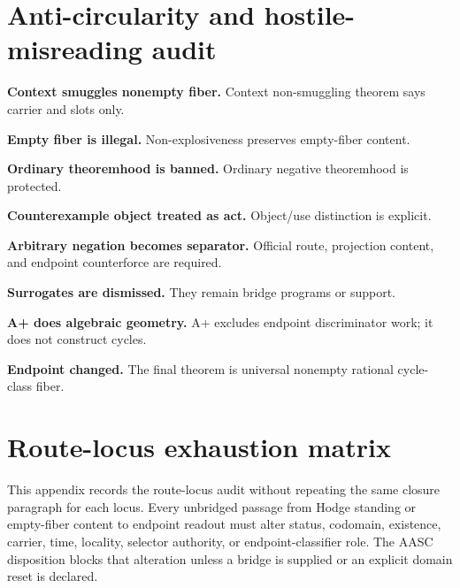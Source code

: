\documentclass[11pt]{article}
\begin{document}
\section{Anti-circularity and hostile-misreading audit}\label{app:anti-circularity}


\par\noindent\textbf{Context smuggles nonempty fiber.} Context non-smuggling theorem says carrier and slots only.


\par\noindent\textbf{Empty fiber is illegal.} Non-explosiveness preserves empty-fiber content.


\par\noindent\textbf{Ordinary theoremhood is banned.} Ordinary negative theoremhood is protected.


\par\noindent\textbf{Counterexample object treated as act.} Object/use distinction is explicit.


\par\noindent\textbf{Arbitrary negation becomes separator.} Official route, projection content, and endpoint counterforce are required.


\par\noindent\textbf{Surrogates are dismissed.} They remain bridge programs or support.


\par\noindent\textbf{A+ does algebraic geometry.} A+ excludes endpoint discriminator work; it does not construct cycles.


\par\noindent\textbf{Endpoint changed.} The final theorem is universal nonempty rational cycle-class fiber.


\section{Route-locus exhaustion matrix}\label{app:route-loci}

This appendix records the route-locus audit without repeating the same closure paragraph for each locus. Every unbridged passage from Hodge standing or empty-fiber content to endpoint readout must alter status, codomain, existence, carrier, time, locality, selector authority, or endpoint-classifier role. The AASC disposition blocks that alteration unless a bridge is supplied or an explicit domain reset is declared.
\end{document}
